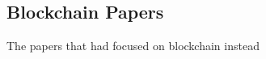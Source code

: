 \documentclass{article}
\begin{document}
    \subsection{Blockchain Papers}
    The papers that had focused on blockchain instead

    \pagebreak
    
    
\end{document}
